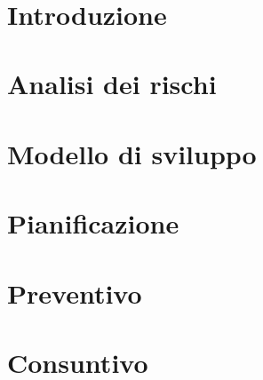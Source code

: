 \documentclass[12pt, a4paper,table]{article}
\title{\textsc{\docNome}}
\author{}
\date{}
\begin{document}


\tableofcontents
\newpage
\section{Introduzione}
    
\section{Analisi dei rischi}
      
\section{Modello di sviluppo}
      
\section{Pianificazione}
      
      
\section{Preventivo}
      
\section{Consuntivo}
\end{document}
